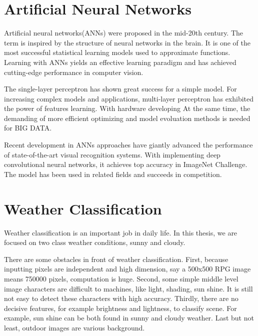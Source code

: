 \section{Artificial Neural Networks}

Artificial neural networks(ANNs) were proposed in the mid-20th century. The term is inspired by the structure of neural networks in the brain. It is one of the most successful statistical learning models used to approximate functions. Learning with ANNs yields an effective learning paradigm and has achieved cutting-edge performance in computer vision. 

The single-layer perceptron  has shown great success for a simple model. For increasing complex models and applications, multi-layer perceptron has exhibited the power of features learning. With hardware developing At the same time, the demanding of more efficient optimizing and model evoluation methods is needed for BIG DATA. 

Recent development in ANNs approaches have giantly advanced the performance of state-of-the-art visual recognition systems. With implementing deep convolutional neural networks, it achieves top accuracy in ImageNet Challenge. The model has been used in related fields and succeeds in competition.

\section{Weather Classification}

Weather classification is an important job in daily life. In this thesis, we are focused on two class weather conditions, sunny and cloudy. 

There are some obstacles in front of weather classification. First, because inputting pixels are independent and high dimension, say a 500x500 RPG image means 750000 pixels, computation is huge. Second, some simple middle level image characters are difficult to machines, like light, shading, sun shine. It is still not easy to detect these characters with high accuracy.  Thirdly, there are no decisive features, for example brightness and lightness, to classify scene. For example, sun shine can be both found in sunny and cloudy weather. Last but not least, outdoor images are various background.


